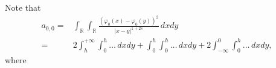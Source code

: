 \documentclass[11 pt]{article}
\numberwithin{equation}{section}
\newcommand{\RR}{\mathbb{R}}
\begin{document}
Note that
	\begin{align*}
	a_{0,0}= & \int_{\RR}\int_{\RR}\frac{(\varphi_0(x)-\varphi_0(y))^2}{|x-y|^{1+2s}}\,dxdy
	\\
	=& 2\int_{h}^{+\infty}\int_{0}^{h} \ldots\,dxdy  + \int_{0}^{h}\int_{0}^{h} \ldots\,dxdy + 2\int_{-\infty}^{0}\int_{0}^{h} \ldots\,dxdy,
\end{align*}
where 













\end{document}
